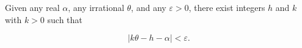 Given any real $\alpha$, any irrational $\theta$, and any $\varepsilon > 0$, there exist integers $h$ and $k$ with $k > 0$ such that

$$|k\theta - h - \alpha| < \varepsilon.$$
